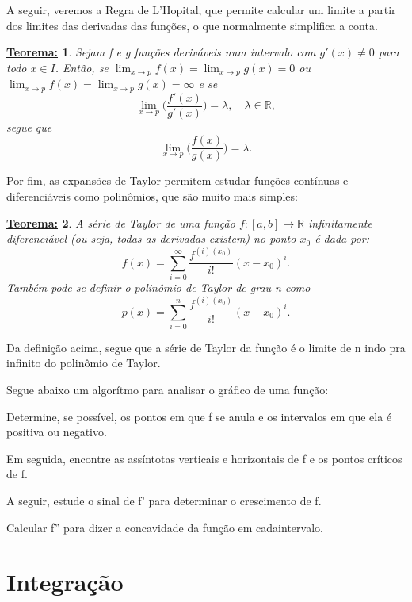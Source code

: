 \documentclass{article}
\newtheorem*{thm*}{\underline{Teorema:}}
\begin{document}
    A seguir, veremos a Regra de L'Hopital, que permite calcular um limite a partir dos limites das derivadas das fun\c c\~oes, o que normalmente simplifica a conta.
    \begin{thm*}
        Sejam f e g fun\c c\~oes deriv\'aveis num intervalo com $g'(x)\neq0$ para todo $x\in{I}$. Ent\~ao, se $\lim_{x\to{p}}f(x) = \lim_{x\to{p}}g(x) = 0$ ou 
        $\lim_{x\to{p}}f(x) = \lim_{x\to{p}}g(x) = \infty$ e se 
        $$
            \lim_{x\to{p}}\biggl(\frac{f'(x)}{g'(x)}\biggr) = \lambda, \quad\lambda\in\mathbb{R},
        $$
        segue que 
        $$ 
            \lim_{x\to{p}}\biggl(\frac{f(x)}{g(x)}\biggr) = \lambda.
        $$
    \end{thm*}
    
    Por fim, as expans\~oes de Taylor permitem estudar fun\c c\~oes cont\'inuas e diferenci\'aveis como polin\^omios, que s\~ao muito mais simples:
    \begin{thm*}
        A s\'erie de Taylor de uma fun\c c\~ao $f:[a, b]\rightarrow\mathbb{R}$ infinitamente diferenci\'avel (ou seja, todas as derivadas existem) no ponto $x_0$ \'e
        dada por:
        $$
            f(x) = \sum_{i=0}^{\infty}\frac{f^{(i)(x_0)}}{i!}(x-x_0)^i.
        $$
        Tamb\'em pode-se definir o polin\^omio de Taylor de grau n como
        $$
            p(x) = \sum_{i=0}^{n}\frac{f^{(i)(x_0)}}{i!}(x-x_0)^i.
        $$
    \end{thm*}
    Da defini\c c\~ao acima, segue que a s\'erie de Taylor da fun\c c\~ao \'e o limite de n indo pra infinito do polin\^omio de Taylor.\vspace{0.5cm}

    Segue abaixo um algor\'itmo para analisar o gr\'afico de uma fun\c c\~ao:

    Determine, se poss\'ivel, os pontos em que f se anula e os intervalos em que ela \'e positiva ou negativo. 
    
    Em seguida, encontre as ass\'intotas verticais e horizontais
    de f e os pontos cr\'iticos de f. 
    
    A seguir, estude o sinal de f' para determinar o crescimento de f. 
    
    Calcular f'' para dizer a concavidade da fun\c c\~ao em cadaintervalo.

    \newpage
    \section{Integra\c c\~ao}
\end{document}

